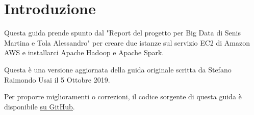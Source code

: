 \section{Introduzione}

Questa guida prende spunto dal "Report del progetto per Big Data di Senis Martina e Tola Alessandro" per creare due istanze sul servizio EC2 di Amazon AWS e installarci Apache Hadoop e Apache Spark.

Questa è una versione aggiornata della guida originale scritta da Stefano Raimondo Usai il 5 Ottobre 2019.

Per proporre miglioramenti o correzioni, il codice sorgente di questa guida è disponibile \underline{\href{https://github.com/costantino2000/big-data-aws-guide}{su GitHub}}.
